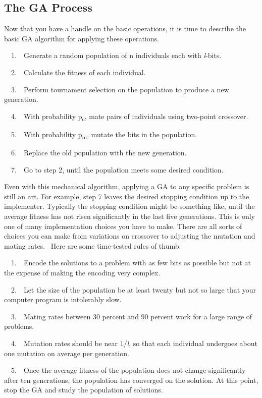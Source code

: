 \subsection{The GA Process}
Now that you have a handle on the basic operations, it is time to
describe the basic GA algorithm for applying these operations. 

\ \ 1.\ \ Generate a random population of n individuals each with
\textit{l}{}-bits.

\ \ 2.\ \ Calculate the fitness of each individual.

\ \ 3.\ \ Perform tournament selection on the population to produce a
new generation.

\ \ 4.\ \ With probability p\textsubscript{c}, mate pairs of individuals
using two-point crossover.

\ \ 5.\ \ With probability p\textsubscript{m}, mutate the bits in the
population.

\ \ 6.\ \ Replace the old population with the new generation.

\ \ 7.\ \ Go to step 2, until the population meets some desired
condition.

Even with this mechanical algorithm, applying a GA to any specific
problem is still an art. For example, step 7 leaves the desired
stopping condition up to the implementer. Typically the stopping
condition might be something like, until the average fitness has not
risen significantly in the last five generations. This is only one of
many implementation choices you have to make. There are all sorts of
choices you can make from variations on crossover to adjusting the
mutation and mating rates. \ Here are some time-tested rules of thumb:

\ \ 1.\ \ Encode the solutions to a problem with as few bits as possible
but not at the expense of making the encoding very complex. 

\ \ 2.\ \ Let the size of the population be at least twenty but not so
large that your computer program is intolerably slow. 

\ \ 3.\ \ Mating rates between 30 percent and 90 percent work for a
large range of problems.

\ \ 4.\ \ Mutation rates should be near 1/\textit{l}, so that each
individual undergoes about one mutation on average per generation.

\ \ 5.\ \ Once the average fitness of the population does not change
significantly after ten generations, the population has converged on
the solution. At this point, stop the GA and study the population of
solutions.

